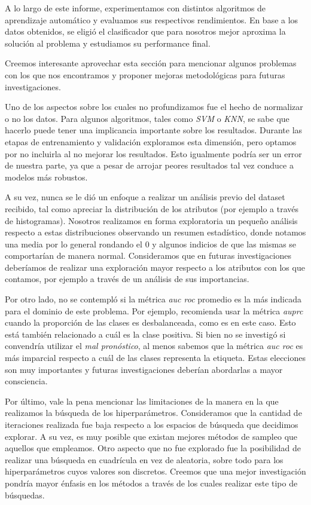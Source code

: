 A lo largo de este informe, experimentamos con distintos algoritmos de aprendizaje automático y evaluamos sus respectivos rendimientos. En base a los datos obtenidos, se eligió el clasificador que para nosotros mejor aproxima la solución al problema y estudiamos su performance final. 

Creemos interesante aprovechar esta sección para mencionar algunos problemas con los que nos encontramos y proponer mejoras metodológicas para futuras investigaciones.

Uno de los aspectos sobre los cuales no profundizamos fue el hecho de normalizar o no los datos. Para algunos algoritmos, tales como \textit{SVM} o \textit{KNN}, se sabe que hacerlo puede tener una implicancia importante sobre los resultados. Durante las etapas de entrenamiento y validación exploramos esta dimensión, pero optamos por no incluirla al no mejorar los resultados. Esto igualmente podría ser un error de nuestra parte, ya que a pesar de arrojar peores resultados tal vez conduce a modelos más robustos.

A su vez, nunca se le dió un enfoque a realizar un análisis previo del dataset recibido, tal como apreciar la distribución de los atributos (por ejemplo a través de histogramas). Nosotros realizamos en forma exploratoria un pequeño análisis respecto a estas distribuciones observando un resumen estadístico, donde notamos una media por lo general rondando el $0$ y algunos indicios de que las mismas se comportarían de manera normal. Consideramos que en futuras investigaciones deberíamos de realizar una exploración mayor respecto a los atributos con los que contamos, por ejemplo a través de un análisis de sus importancias.

Por otro lado, no se contempló si la métrica \textit{auc roc} promedio es la más indicada para el dominio de este problema. Por ejemplo, \cite{Saito} recomienda usar la métrica \textit{auprc} cuando la proporción de las clases es desbalanceada, como es en este caso. Esto está también relacionado a cuál es la clase positiva. Si bien no se investigó si convendría utilizar el \textit{mal pronóstico}, al menos sabemos que la métrica \textit{auc roc} es más imparcial respecto a cuál de las clases representa la etiqueta. Estas elecciones son muy importantes y futuras investigaciones deberían abordarlas a mayor consciencia.

Por último, vale la pena mencionar las limitaciones de la manera en la que realizamos la búsqueda de los hiperparámetros. Consideramos que la cantidad de iteraciones realizada fue baja respecto a los espacios de búsqueda que decidimos explorar. A su vez, es muy posible que existan mejores métodos de sampleo que aquellos que empleamos. Otro aspecto que no fue explorado fue la posibilidad de realizar una búsqueda en cuadrícula en vez de aleatoria, sobre todo para los hiperparámetros cuyos valores son discretos. Creemos que una mejor investigación pondría mayor énfasis en los métodos a través de los cuales realizar este tipo de búsquedas.